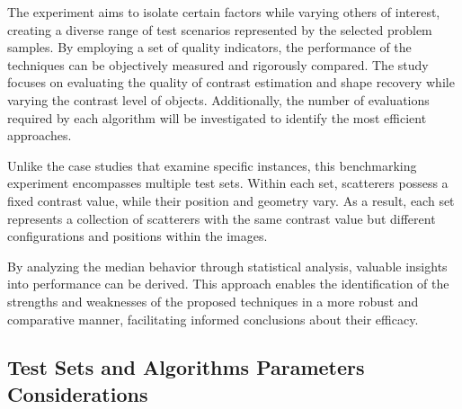		The experiment aims to isolate certain factors while varying others of interest, creating a diverse range of test scenarios represented by the selected problem samples. By employing a set of quality indicators, the performance of the techniques can be objectively measured and rigorously compared. The study focuses on evaluating the quality of contrast estimation and shape recovery while varying the contrast level of objects. Additionally, the number of evaluations required by each algorithm will be investigated to identify the most efficient approaches.
		
		Unlike the case studies that examine specific instances, this benchmarking experiment encompasses multiple test sets. Within each set, scatterers possess a fixed contrast value, while their position and geometry vary. As a result, each set represents a collection of scatterers with the same contrast value but different configurations and positions within the images.
		
		By analyzing the median behavior through statistical analysis, valuable insights into performance can be derived. This approach enables the identification of the strengths and weaknesses of the proposed techniques in a more robust and comparative manner, facilitating informed conclusions about their efficacy.
		
		\subsection{Test Sets  and Algorithms Parameters Considerations}\label{chap:results:benchmark:considerations}
		
